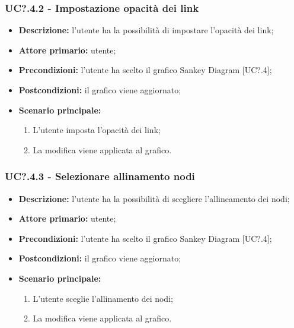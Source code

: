   \subsubsection{UC?.4.2 - Impostazione opacità dei link}
  \begin{itemize}
    \item \textbf{Descrizione:} l'utente ha la possibilità di impostare l'opacità dei link;
    \item \textbf{Attore primario:} utente;
    \item \textbf{Precondizioni:} l’utente ha scelto il grafico Sankey Diagram [UC?.4];
    \item \textbf{Postcondizioni:} il grafico viene aggiornato;
    \item \textbf{Scenario principale:}
      \begin{enumerate}
      \item L'utente imposta l'opacità dei link;
      \item La modifica viene applicata al grafico.
    \end{enumerate}
  \end{itemize}

  \subsubsection{UC?.4.3 - Selezionare allinamento nodi}
  \begin{itemize}
    \item \textbf{Descrizione:} l'utente ha la possibilità di scegliere l'allineamento dei nodi;
    \item \textbf{Attore primario:} utente;
    \item \textbf{Precondizioni:} l’utente ha scelto il grafico Sankey Diagram [UC?.4];
    \item \textbf{Postcondizioni:} il grafico viene aggiornato;
    \item \textbf{Scenario principale:}
     \begin{enumerate}
      \item L'utente sceglie l'allinamento dei nodi;
      \item La modifica viene applicata al grafico.
    \end{enumerate}
  \end{itemize}

